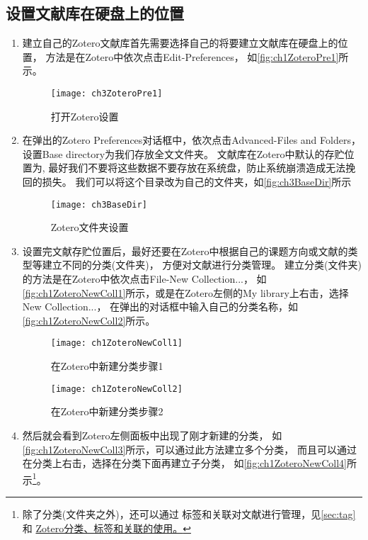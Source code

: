 \documentclass[cn,11pt,chinese]{elegantbook}
\begin{document}
	\subsection{设置文献库在硬盘上的位置} 
	\begin{enumerate}
		\item 
		建立自己的Zotero文献库首先需要选择自己的将要建立文献库在硬盘上的位置，
		方法是在Zotero中依次点击Edit-Preferences，
		如\autoref{fig:ch1ZoteroPre1}所示。
		\begin{figure}[htbp]
			\centering
			\texttt{[image: ch3ZoteroPre1]}
			\caption{打开Zotero设置}
			\label{fig:ch1ZoteroPre1}
		\end{figure}
		
		\item 
		在弹出的Zotero Preferences对话框中，依次点击Advanced-Files and Folders，
		设置Base directory为我们存放全文文件夹。
		文献库在Zotero中默认的存贮位置为,
		最好我们不要将这些数据不要存放在系统盘，防止系统崩溃造成无法挽回的损失。
		我们可以将这个目录改为自己的文件夹，如\autoref{fig:ch3BaseDir}所示
		\begin{figure}[htbp]
			\centering
			\texttt{[image: ch3BaseDir]}
			\caption{Zotero文件夹设置}
			\label{fig:ch3BaseDir}
		\end{figure}
		\item \label{sec:creat_folder}
		设置完文献存贮位置后，最好还要在Zotero中根据自己的课题方向或文献的类型等建立不同的分类(文件夹)，
		方便对文献进行分类管理。
		建立分类(文件夹)的方法是在Zotero中依次点击File-New Collection...，
		如\autoref{fig:ch1ZoteroNewColl1}所示，或是在Zotero左侧的My library上右击，选择New Collection...，
		在弹出的对话框中输入自己的分类名称，如\autoref{fig:ch1ZoteroNewColl2}所示。
		\begin{figure}
			\centering
			\begin{minipage}[t]{\dimexpr0.5\textwidth-4em}
				\centering
				\texttt{[image: ch1ZoteroNewColl1]}
				\caption{在Zotero中新建分类步骤1}
				\label{fig:ch1ZoteroNewColl1}
			\end{minipage}
		   \hspace{1.5cm}
			\begin{minipage}[t]{\dimexpr0.5\textwidth-4em}
				\centering
				\texttt{[image: ch1ZoteroNewColl2]}
				\caption{在Zotero中新建分类步骤2}
				\label{fig:ch1ZoteroNewColl2}
			\end{minipage}
		\end{figure}
		\item 
		然后就会看到Zotero左侧面板中出现了刚才新建的分类，
		如\autoref{fig:ch1ZoteroNewColl3}所示，可以通过此方法建立多个分类，
		而且可以通过在分类上右击，选择在分类下面再建立子分类，
		如\autoref{fig:ch1ZoteroNewColl4}所示\footnote{除了分类(文件夹之外)，还可以通过
		标签和关联对文献进行管理，见\cref{sec:tag}和
		\href{https://zhuanlan.zhihu.com/p/275707703}{Zotero分类、标签和关联的使用。}}。
		

\end{enumerate}
\end{document}
